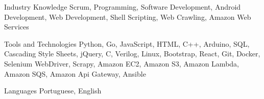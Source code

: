 


\begin{cvskills}


\cvskill
{Industry Knowledge} %
{Scrum, Programming, Software Development, Android Development, Web Development, \hfill \break Shell Scripting, Web Crawling, Amazon Web Services} %


\cvskill
{Tools and Technologies} %
{Python, Go, JavaScript, HTML, C++, Arduino, SQL, Cascading Style Sheets, jQuery, \hfill \break 
C, Verilog, Linux, Bootstrap, React, Git, Docker, Selenium WebDriver, Scrapy,  \hfill \break Amazon EC2, Amazon S3, Amazon Lambda, Amazon SQS, Amazon Api Gateway, Ansible} %


\cvskill
{Languages} %
{Portuguese, English} %


\end{cvskills}